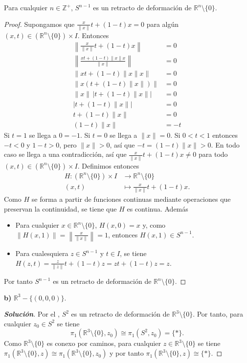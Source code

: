 \begin{Lema}\label{Lema:Esfera_retracto_de_Rn_menos_origen}
Para cualquier $n\in\mathbb{Z}^+$, $S^{n-1}$ es un retracto de deformación de $\mathbb{R}^n\setminus\{0\}$.
\end{Lema}
\begin{proof}
Supongamos que $\frac{x}{\lVert x\rVert}t+(1-t)x=0$ para algún $(x,t)\in(\mathbb{R}^n\setminus\{0\})\times I$. Entonces
\begin{align*}
\left\lVert\frac{x}{\lVert x\rVert}t+(1-t)x\right\rVert&=0\\
\left\lVert\frac{xt+(1-t)\lVert x\rVert x}{\lVert x\rVert}\right\rVert&=0\\
\lVert xt+(1-t)\lVert x\rVert x\rVert&=0\\
\lVert x(t+(1-t)\lVert x\rVert)\rVert&=0\\
\lVert x\rVert\,|t+(1-t)\lVert x\rVert|&=0\\
|t+(1-t)\lVert x\rVert|&=0\\
t+(1-t)\lVert x\rVert&=0\\
(1-t)\lVert x\rVert&=-t
\end{align*}
Si $t=1$ se llega a $0=-1$. Si $t=0$ se llega a $\lVert x\rVert=0$. Si $0<t<1$ entonces $-t<0$ y $1-t>0$, pero $\lVert x\rVert>0$, así que $-t=(1-t)\lVert x\rVert>0$. En todo caso se llega a una contradicción, así que $\frac{x}{\lVert x\rVert}t+(1-t)x\neq0$ para todo $(x,t)\in(\mathbb{R}^n\setminus\{0\})\times I$. Definimos entonces
\begin{align*}
H:(\mathbb{R}^n\setminus\{0\})\times I&\to\mathbb{R}^n\setminus\{0\}\\
(x,t)&\mapsto\frac{x}{\lVert x\rVert}t+(1-t)x.
\end{align*}
Como $H$ se forma a partir de funciones continuas mediante operaciones que preservan la continuidad, se tiene que $H$ es continua. Además
\begin{itemize}
\item Para cualquier $x\in\mathbb{R}^n\setminus\{0\}$, $H(x,0)=x$ y, como $\lVert H(x,1)\rVert=\left\lVert\frac{x}{\lVert x\rVert}\right\rVert=1$, entonces $H(x,1)\in S^{n-1}$.
\item Para cualesquiera $z\in S^{n-1}$ y $t\in I$, se tiene $H(z,t)=\frac{z}{\lVert z\rVert}t+(1-t)z=zt+(1-t)z=z$.
\end{itemize}
Por tanto $S^{n-1}$ es un retracto de deformación de $\mathbb{R}^n\setminus\{0\}$.
\end{proof}
\textbf{b)} $\mathbb{R}^3-\{(0,0,0)\}$.
\begin{proof}[\textbf{Solución}]
Por el , $S^2$ es un retracto de deformación de $\mathbb{R}^3\setminus\{0\}$. Por tanto, para cualquier $z_0\in S^2$ se tiene
\[
\pi_1(\mathbb{R}^3\setminus\{0\},z_0)\cong\pi_1(S^2,z_0)=\{*\}.
\]
Como $\mathbb{R}^3\setminus\{0\}$ es conexo por caminos, para cualquier $z\in\mathbb{R}^3\setminus\{0\}$ se tiene $\pi_1(\mathbb{R}^3\setminus\{0\},z)\cong\pi_1(\mathbb{R}^3\setminus\{0\},z_0)$ y por tanto $\pi_1(\mathbb{R}^3\setminus\{0\},z)\cong\{*\}$.
\end{proof}
